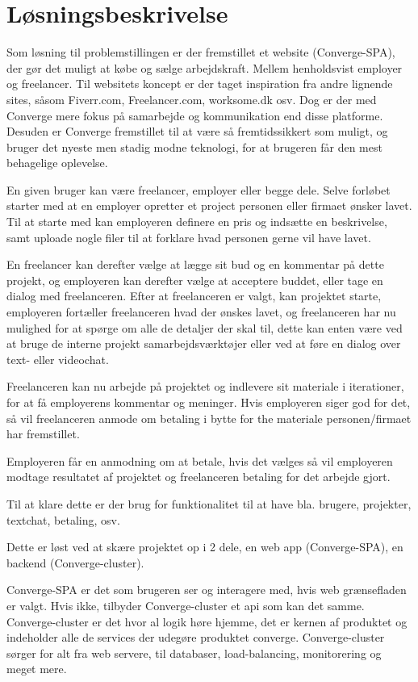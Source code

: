 \section{Løsningsbeskrivelse}

Som løsning til problemstillingen er der fremstillet et website (Converge-SPA), der gør det muligt at købe og sælge arbejdskraft. Mellem henholdsvist employer og freelancer. Til websitets koncept er der taget inspiration fra andre lignende sites, såsom Fiverr.com, Freelancer.com, worksome.dk osv. Dog er der med Converge mere fokus på samarbejde og kommunikation end disse platforme. Desuden er Converge fremstillet til at være så fremtidssikkert som muligt, og bruger det nyeste men stadig modne teknologi, for at brugeren får den mest behagelige oplevelse.

En given bruger kan være freelancer, employer eller begge dele. Selve forløbet starter med at en employer opretter et project personen eller firmaet ønsker lavet. Til at starte med kan employeren definere en pris og indsætte en beskrivelse, samt uploade nogle filer til at forklare hvad personen gerne vil have lavet.

En freelancer kan derefter vælge at lægge sit bud og en kommentar på dette projekt, og employeren kan derefter vælge at acceptere buddet, eller tage en dialog med freelanceren. Efter at freelanceren er valgt, kan projektet starte, employeren fortæller freelanceren hvad der ønskes lavet, og freelanceren har nu mulighed for at spørge om alle de detaljer der skal til, dette kan enten være ved at bruge de interne projekt samarbejdsværktøjer eller ved at føre en dialog over text- eller videochat.

Freelanceren kan nu arbejde på projektet og indlevere sit materiale i iterationer, for at få employerens kommentar og meninger. Hvis employeren siger god for det, så vil freelanceren anmode om betaling i bytte for the materiale personen/firmaet har fremstillet.

Employeren får en anmodning om at betale, hvis det vælges så vil employeren modtage resultatet af projektet og freelanceren betaling for det arbejde gjort.

Til at klare dette er der brug for funktionalitet til at have bla. brugere, projekter, textchat, betaling, osv.

Dette er løst ved at skære projektet op i 2 dele, en web app (Converge-SPA), en backend (Converge-cluster).


Converge-SPA er det som brugeren ser og interagere med, hvis web grænsefladen er valgt. Hvis ikke, tilbyder Converge-cluster et api som kan det samme. Converge-cluster er det hvor al logik høre hjemme, det er kernen af produktet og indeholder alle de services der udegøre produktet converge. Converge-cluster sørger for alt fra web servere, til databaser, load-balancing, monitorering og meget mere.